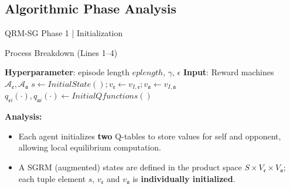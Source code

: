 \documentclass[10pt, aspectratio=169]{beamer}
\newcommand{\evidenzia}[1]{\textcolor{verdeSalvia}{\textbf{#1}}}
\begin{document}
\subsection{Algorithmic Phase Analysis}

\begin{frame}{QRM-SG Phase 1 | Initialization}
    \begin{block}{Process Breakdown (Lines 1--4)}
    \begin{algorithmic}
        \vspace{0.2cm}
        \STATE \textbf{Hyperparameter}: episode length $eplength$, $\gamma$, $\epsilon$
        \STATE \textbf{Input}: Reward machines $\mathcal{A}_{\mathfrak{e}}, \mathcal{A}_{\mathfrak{a}}$
        \vspace{0.2cm}
        \STATE $s \leftarrow InitialState(); v_{\mathfrak{e}} \leftarrow v_{I,\mathfrak{e}}; v_{\mathfrak{a}} \leftarrow v_{I,\mathfrak{a}}$ 
        \STATE $q_{\mathfrak{e}i}(\cdot), q_{\mathfrak{a}i}(\cdot) \leftarrow InitialQfunctions()$ 
    \end{algorithmic}
    \end{block}
    \evidenzia{Analysis:}
    \begin{itemize}
        \item Each agent initializes \evidenzia{two} Q-tables to store values for self and opponent, allowing local equilibrium computation. 
        \item A SGRM (augmented) states are defined in the product space $S \times V_{\mathfrak{e}} \times V_{\mathfrak{a}}$; each tuple element $s$, $v_{\mathfrak{e}}$ and $v_{\mathfrak{a}}$ is \evidenzia{individually initialized}.  %
    \end{itemize}
\end{frame}
\end{document}

